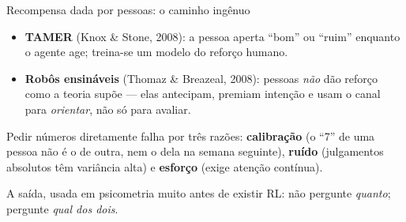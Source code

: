 \documentclass[aspectratio=169, 11pt]{beamer}
\begin{document}
\begin{frame}{Recompensa dada por pessoas: o caminho ingênuo}

  \begin{itemize}\setlength{\itemsep}{0.35ex}
    \item \textbf{TAMER} (Knox \& Stone, 2008): a pessoa aperta ``bom'' ou
      ``ruim'' enquanto o agente age; treina-se um modelo do reforço humano.
    \item \textbf{Robôs ensináveis} (Thomaz \& Breazeal, 2008): pessoas
      \emph{não} dão reforço como a teoria supõe --- elas antecipam, premiam
      intenção e usam o canal para \emph{orientar}, não só para avaliar.
  \end{itemize}

  \begin{alertabox}
    Pedir números diretamente falha por três razões: \textbf{calibração} (o
    ``7'' de uma pessoa não é o de outra, nem o dela na semana seguinte),
    \textbf{ruído} (julgamentos absolutos têm variância alta) e \textbf{esforço}
    (exige atenção contínua).
  \end{alertabox}

  \begin{ideiabox}
    A saída, usada em psicometria muito antes de existir RL: não pergunte
    \emph{quanto}; pergunte \emph{qual dos dois}.
  \end{ideiabox}
\end{frame}
\end{document}
